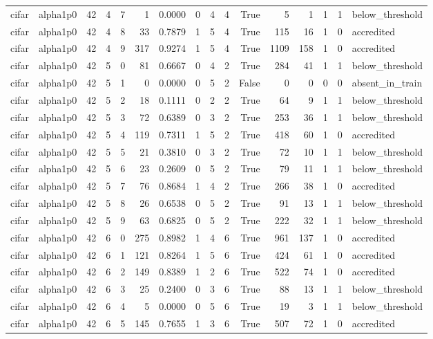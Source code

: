 \begin{tabular}{llrrrrrrrrrrrrrl}
cifar & alpha1p0 & 42 & 4 & 7 & 1 & 0.0000 & 0 & 4 & 4 & True & 5 & 1 & 1 & 1 & below\_threshold \\
cifar & alpha1p0 & 42 & 4 & 8 & 33 & 0.7879 & 1 & 5 & 4 & True & 115 & 16 & 1 & 0 & accredited \\
cifar & alpha1p0 & 42 & 4 & 9 & 317 & 0.9274 & 1 & 5 & 4 & True & 1109 & 158 & 1 & 0 & accredited \\
cifar & alpha1p0 & 42 & 5 & 0 & 81 & 0.6667 & 0 & 4 & 2 & True & 284 & 41 & 1 & 1 & below\_threshold \\
cifar & alpha1p0 & 42 & 5 & 1 & 0 & 0.0000 & 0 & 5 & 2 & False & 0 & 0 & 0 & 0 & absent\_in\_train \\
cifar & alpha1p0 & 42 & 5 & 2 & 18 & 0.1111 & 0 & 2 & 2 & True & 64 & 9 & 1 & 1 & below\_threshold \\
cifar & alpha1p0 & 42 & 5 & 3 & 72 & 0.6389 & 0 & 3 & 2 & True & 253 & 36 & 1 & 1 & below\_threshold \\
cifar & alpha1p0 & 42 & 5 & 4 & 119 & 0.7311 & 1 & 5 & 2 & True & 418 & 60 & 1 & 0 & accredited \\
cifar & alpha1p0 & 42 & 5 & 5 & 21 & 0.3810 & 0 & 3 & 2 & True & 72 & 10 & 1 & 1 & below\_threshold \\
cifar & alpha1p0 & 42 & 5 & 6 & 23 & 0.2609 & 0 & 5 & 2 & True & 79 & 11 & 1 & 1 & below\_threshold \\
cifar & alpha1p0 & 42 & 5 & 7 & 76 & 0.8684 & 1 & 4 & 2 & True & 266 & 38 & 1 & 0 & accredited \\
cifar & alpha1p0 & 42 & 5 & 8 & 26 & 0.6538 & 0 & 5 & 2 & True & 91 & 13 & 1 & 1 & below\_threshold \\
cifar & alpha1p0 & 42 & 5 & 9 & 63 & 0.6825 & 0 & 5 & 2 & True & 222 & 32 & 1 & 1 & below\_threshold \\
cifar & alpha1p0 & 42 & 6 & 0 & 275 & 0.8982 & 1 & 4 & 6 & True & 961 & 137 & 1 & 0 & accredited \\
cifar & alpha1p0 & 42 & 6 & 1 & 121 & 0.8264 & 1 & 5 & 6 & True & 424 & 61 & 1 & 0 & accredited \\
cifar & alpha1p0 & 42 & 6 & 2 & 149 & 0.8389 & 1 & 2 & 6 & True & 522 & 74 & 1 & 0 & accredited \\
cifar & alpha1p0 & 42 & 6 & 3 & 25 & 0.2400 & 0 & 3 & 6 & True & 88 & 13 & 1 & 1 & below\_threshold \\
cifar & alpha1p0 & 42 & 6 & 4 & 5 & 0.0000 & 0 & 5 & 6 & True & 19 & 3 & 1 & 1 & below\_threshold \\
cifar & alpha1p0 & 42 & 6 & 5 & 145 & 0.7655 & 1 & 3 & 6 & True & 507 & 72 & 1 & 0 & accredited \\

\end{tabular}
